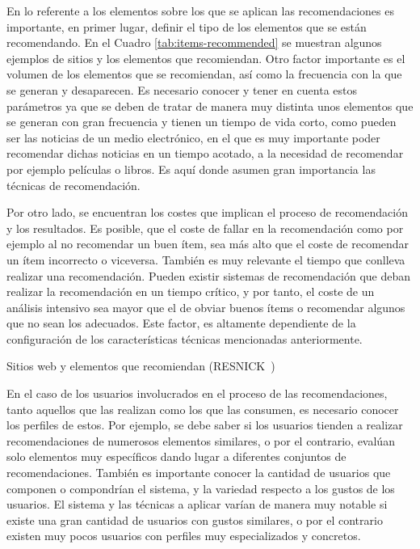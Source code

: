 En lo referente a los elementos sobre los que se aplican las recomendaciones es importante, en primer lugar, definir el tipo de los elementos que se están recomendando. En el Cuadro \ref{tab:items-recommended} se muestran algunos ejemplos de sitios y los elementos que recomiendan. Otro factor importante es el volumen de los elementos que se recomiendan, así como la frecuencia con la que se generan y desaparecen. Es necesario conocer y tener en cuenta estos parámetros ya que se deben de tratar de manera muy distinta unos elementos que se generan con gran frecuencia y tienen un tiempo de vida corto, como pueden ser las noticias de un medio electrónico, en el que es muy importante poder recomendar dichas noticias en un tiempo acotado, a la necesidad de recomendar por ejemplo películas o libros. Es aquí donde asumen gran importancia las técnicas de recomendación. 

Por otro lado, se encuentran los costes que implican el proceso de recomendación y los resultados. Es posible, que el coste de fallar en la recomendación como por ejemplo al no recomendar un buen ítem, sea más alto que el coste de recomendar un ítem incorrecto o viceversa. También es muy relevante el tiempo que conlleva realizar una recomendación. Pueden existir sistemas de recomendación que deban realizar la recomendación en un tiempo crítico, y por tanto, el coste de un análisis intensivo sea mayor que el de obviar buenos ítems o recomendar algunos que no sean los adecuados. Este factor, es altamente dependiente de la configuración de los características técnicas mencionadas anteriormente.  

\begin{table}[hp]
  \centering
  {\small
  
  }
  \caption[Sitios web y elementos que recomiendan]
  {Sitios web y elementos que recomiendan
    (\textsc{RESNICK}~\cite{Lu})}
  \label{tab:items-recommended}
\end{table}


En el caso de los usuarios involucrados en el proceso de las recomendaciones, tanto aquellos que las realizan como los que las consumen, es necesario conocer los perfiles de estos. Por ejemplo, se debe saber si los usuarios tienden a realizar recomendaciones de numerosos elementos similares, o por el contrario, evalúan solo elementos muy específicos dando lugar a diferentes conjuntos de recomendaciones. También es importante conocer la cantidad de usuarios que componen o compondrían el sistema, y la variedad respecto a los gustos de los usuarios. El sistema y las técnicas a aplicar varían de manera muy notable si existe una gran cantidad de usuarios con gustos similares, o por el contrario existen muy pocos usuarios con perfiles muy especializados y concretos.



